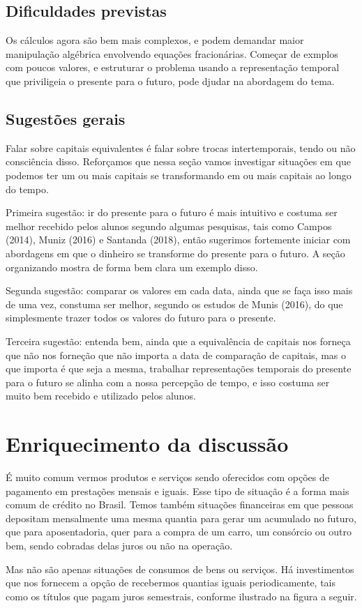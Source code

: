 \begin{paginatexto}
\subsection{Dificuldades previstas} Os cálculos agora são bem mais complexos, e podem demandar maior manipulação algébrica envolvendo equações fracionárias. Começar de exmplos com poucos valores, e estruturar o problema usando a representação temporal que priviligeia o presente para o futuro, pode djudar na abordagem do tema.

\subsection{Sugestões gerais}

Falar sobre capitais equivalentes é falar sobre trocas intertemporais, tendo ou não consciência disso. Reforçamos que nessa seção vamos investigar situações em que podemos ter um ou mais capitais se transformando em ou mais capitais ao longo do tempo.

Primeira sugestão: ir do presente para o futuro é mais intuitivo e costuma ser melhor recebido pelos alunos segundo algumas pesquisas, tais como Campos (2014), Muniz (2016) e Santanda (2018), então sugerimos fortemente iniciar com abordagens em que o dinheiro se transforme do presente para o futuro. A seção organizando mostra de forma bem clara um exemplo disso.

Segunda sugestão: comparar os valores em cada data, ainda que se faça isso mais de uma vez, constuma ser melhor, segundo os estudos de Munis (2016), do que simplesmente trazer todos os valores do futuro para o presente.

Terceira sugestão: entenda bem, ainda que a equivalência de capitais nos forneça que não nos forneção que não importa a data de comparação de capitais, mas o que importa é que seja a mesma, trabalhar representações temporais do presente para o futuro se alinha com a nossa percepção de tempo, e isso costuma ser muito bem recebido e utilizado pelos alunos.

\columnbreak
\section{Enriquecimento da discussão}

É muito comum vermos produtos e serviços sendo oferecidos com opções de pagamento em prestações mensais e iguais. Esse tipo de situação é a forma mais comum de crédito no Brasil. Temos também situações financeiras em que pessoas depositam mensalmente uma mesma quantia para gerar um acumulado no futuro, que para aposentadoria, quer para a compra de um carro, um consórcio ou outro bem, sendo cobradas delas juros ou não na operação.

Mas não são apenas situações de consumos de bens ou serviços. Há investimentos que nos fornecem a opção de recebermos quantias iguais periodicamente, tais como os títulos que pagam juros semestrais, conforme ilustrado na figura a seguir.
\end{paginatexto}

